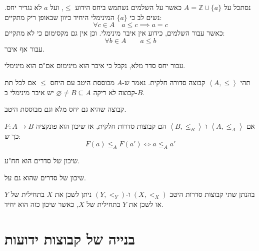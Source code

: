 \documentclass{tstextbook}
\begin{document}
\begin{example}
נסתכל על \(A=\mathbb{Z}\cup \{ a \}\) כאשר על השלמים נשתמש ביחס הידוע \(\leq\), ועל \(a\) לא נגדיר יחס. נשים לב כי \(\{ a \}\) המינימלי היחיד כיוון שבאופן ריק מתקיים:
$$\forall c \in A\quad a\leq c\implies a=c$$
כאשר עבור השלמים, כידוע אין איבר מינימלי. וכן אין גם מקסימום כי לא מתקיים:
$$\forall b \in A\qquad a\leq b$$
עבור אף איבר.

\end{example}
\begin{proposition}
עבור יחס סדר מלא, נקבל כי איבר הוא מינימום אם"ם הוא מינימלי.

\end{proposition}
\begin{definition}
תהי \(\left\langle  A,\leq  \right\rangle\) קבוצה סדורה חלקית. נאמר ש-\(A\) מבוססת היטב עם היחס \(\leq\) אם לכל תת קבוצה לא ריקה \(\varnothing \neq B \subseteq A\) יש איבר מינימלי ב-\(B\).

\end{definition}
\begin{definition}
קבוצה שהיא גם יחס מלא וגם מבוססת היטב.

\end{definition}
\begin{definition}
אם \(\left\langle  A,\leq_{A}  \right\rangle\) ו-\(\left\langle  B,\leq_{B}  \right\rangle\) הם קבוצות סדרות חלקית, אז שיכון הוא פונקציה \(F:A\to B\) כך ש:
$$F(a)\leq_{A}F(a')\iff a \leq_{A}a'$$

\end{definition}
\begin{proposition}
שיכון של סדרים הוא חח"ע.

\end{proposition}
\begin{definition}
שיכון של סדרים שהוא גם על.

\end{definition}
\begin{proposition}
בהנתן שתי קבוצות סדרות היטב \((X,<_{X})\) ו-\((Y,<_{Y})\) ניתן לשכן את \(X\) בתחילית של \(Y\) או לשכן את \(Y\) בתחילית של \(X\), כאשר שיכון כזה הוא יחיד.

\end{proposition}
\section{בנייה של קבוצות ידועות}
\end{document}
